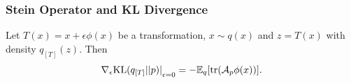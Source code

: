 \documentclass[aspectratio=169]{beamer}
\begin{document}
\begin{frame}
    \frametitle{Stein Operator and KL Divergence}
    Let $T(x) = x + \epsilon \phi(x)$ be a transformation, $x \sim q(x)$ and $z = T(x)$ with density $q_{[T]}(z)$. Then
    \begin{align*}
        {\nabla_{\epsilon}\textup{KL}(q_{[T]} \vert \vert p)\vert}_{\epsilon = 0} = - \mathbb{E}_q[\textup{tr}(\mathcal{A}_p\phi(x))].
    \end{align*}
\end{frame}
\end{document}
